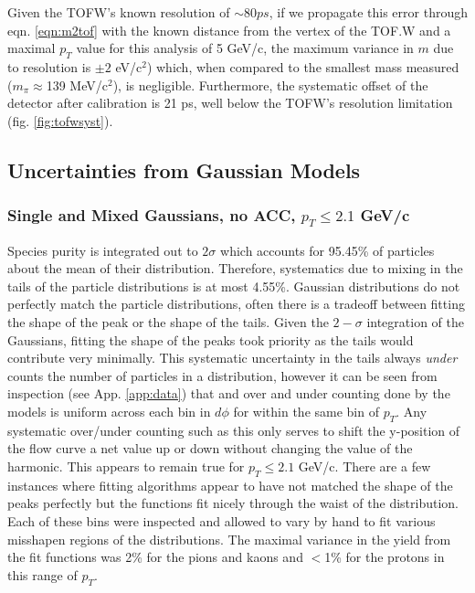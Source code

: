 Given the TOFW's known resolution of $\sim 80 ps$, if we propagate this error through eqn. \ref{eqn:m2tof} with the known distance from the vertex of the TOF.W and a maximal $p_T$ value for this analysis of 5 GeV/c, the maximum variance in $m$ due to resolution is $\pm 2$ eV/c$^2$) which, when compared to the smallest mass measured ($m_{\pi}\approx$139 MeV/c$^2$), is negligible. Furthermore, the systematic offset of the detector after calibration is 21 ps, well below the TOFW's resolution limitation (fig. \ref{fig:tofwsyst}).

\subsection{Uncertainties from Gaussian Models}
\subsubsection{Single and Mixed Gaussians, no ACC, $p_T\leq2.1$ GeV/c}
Species purity is integrated out to $2\sigma$ which accounts for 95.45\% of particles about the mean of their distribution. Therefore, systematics due to mixing in the tails of the particle distributions is at most 4.55\%. Gaussian distributions do not perfectly match the particle distributions, often there is a tradeoff between fitting the shape of the peak or the shape of the tails. Given the $2-\sigma$ integration of the Gaussians, fitting the shape of the peaks took priority as the tails would contribute very minimally. This systematic uncertainty in the tails always \textit{under} counts the number of particles in a distribution, however it can be seen from inspection (see App. \ref{app:data}) that and over and under counting done by the models is uniform across each bin in $d\phi$ for within the same bin of $p_T$. Any systematic over/under counting such as this only serves to shift the y-position of the flow curve a net value up or down without changing the value of the harmonic. This appears to remain true for $p_T \leq 2.1$ GeV/c. There are a few instances where fitting algorithms appear to have not matched the shape of the peaks perfectly but the functions fit nicely through the waist of the distribution. Each of these bins were inspected and allowed to vary by hand to fit various misshapen regions of the distributions. The maximal variance in the yield from the fit functions was 2\% for the pions and kaons and $<$1\% for the protons in this range of $p_T$.

